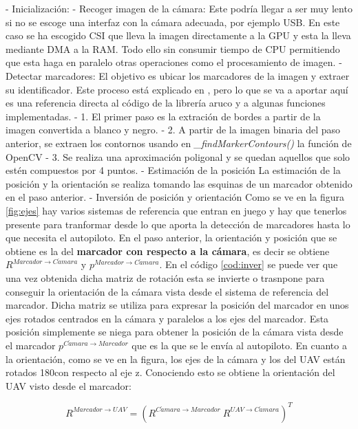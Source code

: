 - Inicialización: 
- Recoger imagen de la cámara: Este podría llegar a ser muy lento si no se escoge una interfaz con la cámara adecuada, por ejemplo USB. En este caso se ha escogido CSI que lleva la imagen directamente a la GPU y esta la lleva mediante DMA a la RAM. Todo ello sin consumir tiempo de CPU permitiendo que esta haga en paralelo otras operaciones como el procesamiento de imagen.
- Detectar marcadores: El objetivo es ubicar los marcadores de la imagen y extraer su identificador.  Este proceso está explicado en \cite{aruco2014}, pero lo que se va a aportar aquí es una referencia directa al código de la librería aruco y a algunas funciones implementadas. 
	- 1. El primer paso es la extración de bordes a partir de la imagen convertida a blanco y negro. 
	- 2. A partir de la imagen binaria del paso anterior, se extraen los contornos usando en \textit{\_findMarkerContours()} la función de OpenCV  \textit{}
	- 3. Se realiza una aproximación poligonal y se quedan aquellos que solo estén compuestos por 4 puntos. 
- Estimación de la posición
	La estimación de la posición y la orientación se realiza tomando las esquinas de un marcador obtenido en el paso anterior.  
- Inversión de posición y orientación 
	Como se ve en la figura \ref{fig:ejes} hay varios sistemas de referencia que entran en juego y hay que tenerlos presente para tranformar desde lo que aporta la detección de marcadores hasta lo que necesita el autopiloto. En el paso anterior, la orientación y posición que se obtiene es la del \textbf{marcador con respecto a la cámara}, es decir se obtiene $R^{Marcador\rightarrow C\acute{a}mara}$ y $p^{Marcador\rightarrow C\acute{a}mara}$. En el código \ref{cod:inver} se puede ver que una vez obtenida dicha matriz de rotación esta se invierte o trasnpone para conseguir la orientación de la cámara vista desde el sistema de referencia del marcador. Dicha matriz se utiliza para expresar la posición del marcador en unos ejes rotados centrados en la cámara y paralelos a los ejes del marcador. Esta posición simplemente se niega para obtener la posición de la cámara vista desde el marcador $p^{C\acute{a}mara\rightarrow Marcador}$ que es la que se le envía al autopiloto. En cuanto a la orientación, como se ve en la figura, los ejes de la cámara y los del UAV están rotados 180\textdegree con respecto al eje z. Conociendo esto se obtiene la orientación del UAV visto desde el marcador:

	\begin{equation}
	R^{Marcador\rightarrow UAV}=\left( R^{C\acute{a}mara\rightarrow Marcador}\ R^{UAV\rightarrow C\acute{a}mara} \right)^T
	\end{equation}

